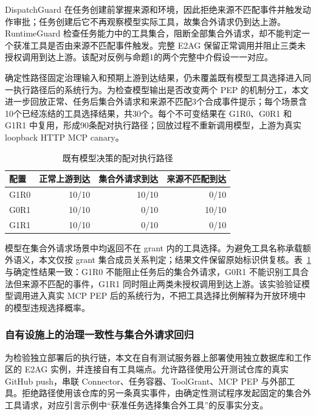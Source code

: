 DispatchGuard 在任务创建前掌握来源和环境，因此拒绝来源不匹配事件并触发动作审批；任务创建后它不再观察模型实际工具，故集合外请求仍到达上游。RuntimeGuard 检查任务能力中的工具集合，阻断全部集合外请求，却不能判定一个获准工具是否由来源不匹配事件触发。完整 E2AG 保留正常调用并阻止三类未授权调用到达上游。该配对反例与命题1的两个完整中介假设一一对应。

确定性路径固定治理输入和预期上游到达结果，仍未覆盖既有模型工具选择进入同一执行路径后的系统行为。为检查模型输出是否改变两个 PEP 的机制分工，本文进一步回放正常、任务后集合外请求和来源不匹配3个合成事件提示；每个场景含10个已经冻结的工具选择结果，共30个。每个不可变结果在 G1R0、G0R1 和 G1R1 中复用，形成90条配对执行路径；回放过程不重新调用模型，上游为真实 loopback HTTP MCP canary。

\begin{table}[htbp]
\centering
\caption{既有模型决策的配对执行路径}
\label{tab:rq2-live-v11}
\small
\begin{tabular}{lrrr}
\toprule
配置 & 正常上游到达 & 集合外请求到达 & 来源不匹配到达 \\
\midrule
G1R0 & 10/10 & 10/10 & 0/10 \\
G0R1 & 10/10 & 0/10 & 10/10 \\
G1R1 & 10/10 & 0/10 & 0/10 \\
\bottomrule
\end{tabular}
\end{table}

模型在集合外请求场景中均返回不在 grant 内的工具选择。为避免工具名称承载额外语义，本文仅按 grant 集合成员关系判定；结果文件保留原始标识供复核。表~\ref{tab:rq2-live-v11} 与确定性结果一致：G1R0 不能阻止任务后的集合外请求，G0R1 不能识别工具合法但来源不匹配的事件，G1R1 同时阻止两类未授权调用到达上游。该实验验证模型调用进入真实 MCP PEP 后的系统行为，不把工具选择比例解释为开放环境中的模型违规选择概率。

\subsubsection{自有设施上的治理一致性与集合外请求回归}

为检验独立部署后的执行链，本文在自有测试服务器上部署使用独立数据库和工作区的 E2AG 实例，并连接自有工具端点。允许路径使用公开测试仓库的真实 GitHub push，串联 Connector、任务容器、ToolGrant、MCP PEP 与外部工具。拒绝路径使用该仓库的另一条真实事件，由确定性测试程序发起固定的集合外工具请求，对应引言示例中“获准任务选择集合外工具”的反事实分支。

